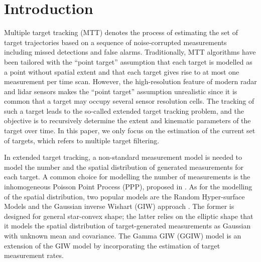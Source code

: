\documentclass[conference]{IEEEtran}
\begin{document}
\section{Introduction}
Multiple target tracking (MTT) denotes the process of estimating the set of target trajectories based on a sequence of noise-corrupted measurements including missed detections and false alarms. Traditionally, MTT algorithms have been tailored with the ``point target'' assumption that each target is modelled as a point without spatial extent and that each target gives rise to at most one measurement per time scan. However, the high-resolution feature of modern radar and lidar sensors makes the “point target” assumption unrealistic since it is common that a target may occupy several sensor resolution cells. The tracking of such a target leads to the so-called extended target tracking problem, and the objective is to recursively determine the extent and kinematic parameters of the target over time. In this paper, we only focus on the estimation of the current set of targets, which refers to multiple target filtering. 

In extended target tracking, a non-standard measurement model is needed to model the number and the spatial distribution of generated measurements for each target. A common choice for modelling the number of measurements is the inhomogeneous Poisson Point Process (PPP), proposed in \cite{ppp}. As for the modelling of the spatial distribution, two popular models are the Random Hyper-surface Models \cite{hypersurface} and the Gaussian inverse Wishart (GIW) approach \cite{randomMatrix,randomMatrix2}. The former is designed for general star-convex shape; the latter relies on the elliptic shape that it models the spatial distribution of target-generated measurements as Gaussian with unknown mean and covariance. The Gamma GIW (GGIW) model \cite{phdextended,cphdextended} is an extension of the GIW model by incorporating the estimation of target measurement rates.
\end{document}
